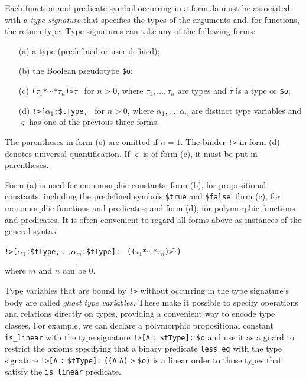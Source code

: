 Each function and predicate symbol occurring in a formula must be associated
with a {\em type signature\/} that specifies the types of the arguments and, for
functions, the return type. Type signatures can take any of the following forms:
%
\begin{enumerate}
\item[(a)] a type (predefined or user-defined);
\item[(b)] the Boolean pseudotype {\tt \$o}; %
\item[(c)] {\tt ($\tau_1$\;*\;${\cdots}$\;*\;$\tau_n$)\;>\;$\tilde \tau$}
\ for $n > 0$, where $\tau_1,\dots,\tau_n$ are types and $\tilde \tau$ is
a type or {\tt \$o};
\item[(d)] {\tt !>[$\alpha_1$\;:\;\$tType,}\;{\tt ${\dots}$,}\;{\tt
$\alpha_n$\;:\;\$tType]:\;$\varsigma$}
\ for $n > 0$, where $\alpha_1,\dots,\alpha_n$ are distinct
type variables and $\varsigma$ has one of the previous three forms.
\end{enumerate}
%
The parentheses in form (c) are omitted if $n = 1$.
The binder {\tt !>} in form (d) denotes universal quantification.
If $\varsigma$ is of form (c), it must be put in parentheses.

Form (a) is used for monomorphic constants; form (b), for
propositional constants, including the predefined symbols {\tt \$true} and
{\tt \$false}; form (c), for monomorphic functions and predicates;
and form (d), for polymorphic functions and predicates. It is often
convenient to regard all forms above as instances of the general syntax
\begin{center}
{\tt !>[$\alpha_1$\;:\;\$tType,\;${\dots}$,\;$\alpha_m$\;:\;\$tType]:} {\tt
(($\tau_1$\;*\;${\cdots}$\;*\;$\tau_n$)\;>\;$\tilde \tau$)}
\end{center}
where $m$ and $n$ can be 0. %

Type variables that are bound by {\tt !>} without
occurring in the type signature's body are called \emph{ghost type variables.}
These make it possible to specify operations and relations directly on types,
providing a convenient way to encode type classes.
For example, we can declare a polymorphic propositional
constant {\tt is\_linear} with the type signature
{\tt !>[A} {\tt :} {\tt \$tType]:} {\tt \$o} and use it as a guard to restrict the
axioms specifying that a binary predicate {\tt less\_eq} with the type signature
{\tt !>[A} {\tt :} {\tt \$tType]:} {\tt ((A} {\tt *} {\tt A)} {\tt >} {\tt \$o)}
is a linear order to those types that satisfy the {\tt is\_linear} predicate.

